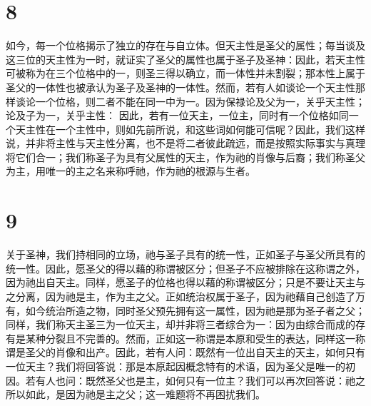 
\section{8}

如今，每一个位格揭示了独立的存在与自立体。但天主性是圣父的属性；每当谈及这三位的天主性为一时，就证实了圣父的属性也属于圣子及圣神：因此，若天主性可被称为在三个位格中的一，则圣三得以确立，而一体性并未割裂；那本性上属于圣父的一体性也被承认为圣子及圣神的一体性。然而，若有人如谈论一个天主性那样谈论一个位格，则二者不能在同一中为一。因为保禄论及父为一，关乎天主性；论及子为一，关乎主性：  因此，若有一位天主，一位主，同时有一个位格如同一个天主性在一个主性中，则如先前所说，和这些词如何能可信呢？因此，我们这样说，并非将主性与天主性分离，也不是将二者彼此疏远，而是按照实际事实与真理将它们合一；我们称圣子为具有父属性的天主，作为祂的肖像与后裔；我们称圣父为主，用唯一的主之名来称呼祂，作为祂的根源与生者。\par


\section{9}

关于圣神，我们持相同的立场，祂与圣子具有的统一性，正如圣子与圣父所具有的统一性。因此，愿圣父的得以藉的称谓被区分；但圣子不应被排除在这称谓之外，因为祂出自天主。同样，愿圣子的位格也得以藉的称谓被区分；只是不要让天主与之分离，因为祂是主，作为主之父。正如统治权属于圣子，因为祂藉自己创造了万有，如今统治所造之物，同时圣父预先拥有这一属性，因为祂是那为圣子者之父；同样，我们称天主圣三为一位天主，却并非将三者综合为一：因为由综合而成的存有是某种分裂且不完善的。然而，正如这一称谓是本原和受生的表达，同样这一称谓是圣父的肖像和出产。因此，若有人问：既然有一位出自天主的天主，如何只有一位天主？我们将回答说：那是本原起因概念特有的术语，因为圣父是唯一的初因。若有人也问：既然圣父也是主，如何只有一位主？我们可以再次回答说：祂之所以如此，是因为祂是主之父；这一难题将不再困扰我们。\par



